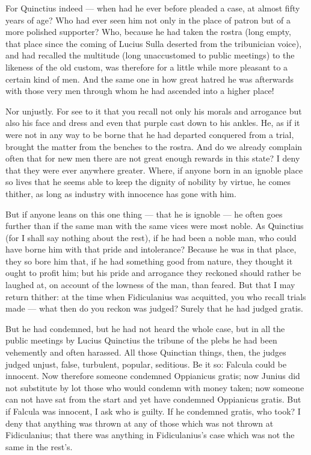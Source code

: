  For Quinctius indeed --- when had he ever before pleaded a case, at almost fifty years of age? Who had ever seen him not only in the place of patron but of a more polished supporter? Who, because he had taken the rostra (long empty, that place since the coming of Lucius Sulla deserted from the tribunician voice), and had recalled the multitude (long unaccustomed to public meetings) to the likeness of the old custom, was therefore for a little while more pleasant to a certain kind of men. And the same one in how great hatred he was afterwards with those very men through whom he had ascended into a higher place!

 Nor unjustly. For see to it that you recall not only his morals and arrogance but also his face and dress and even that purple cast down to his ankles. He, as if it were not in any way to be borne that he had departed conquered from a trial, brought the matter from the benches to the rostra. And do we already complain often that for new men there are not great enough rewards in this state? I deny that they were ever anywhere greater. Where, if anyone born in an ignoble place so lives that he seems able to keep the dignity of nobility by virtue, he comes thither, as long as industry with innocence has gone with him.

 But if anyone leans on this one thing --- that he is ignoble --- he often goes further than if the same man with the same vices were most noble. As Quinctius (for I shall say nothing about the rest), if he had been a noble man, who could have borne him with that pride and intolerance? Because he was in that place, they so bore him that, if he had something good from nature, they thought it ought to profit him; but his pride and arrogance they reckoned should rather be laughed at, on account of the lowness of the man, than feared. But that I may return thither: at the time when Fidiculanius was acquitted, you who recall trials made --- what then do you reckon was judged? Surely that he had judged gratis.

 But he had condemned, but he had not heard the whole case, but in all the public meetings by Lucius Quinctius the tribune of the plebs he had been vehemently and often harassed. All those Quinctian things, then, the judges judged unjust, false, turbulent, popular, seditious. Be it so: Falcula could be innocent. Now therefore someone condemned Oppianicus gratis; now Junius did not substitute by lot those who would condemn with money taken; now someone can not have sat from the start and yet have condemned Oppianicus gratis. But if Falcula was innocent, I ask who is guilty. If he condemned gratis, who took? I deny that anything was thrown at any of those which was not thrown at Fidiculanius; that there was anything in Fidiculanius's case which was not the same in the rest's.

